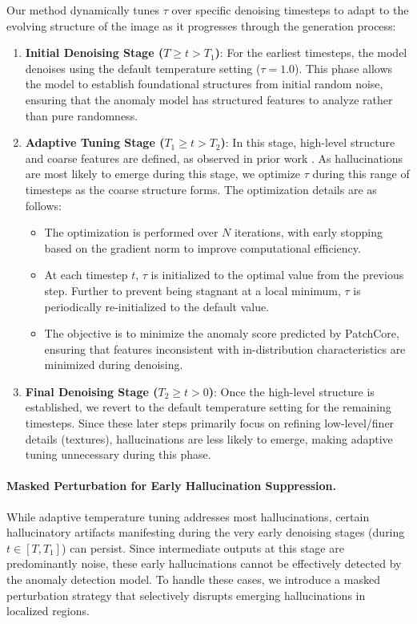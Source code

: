 Our method dynamically tunes $\tau$ over specific denoising timesteps to adapt to the evolving structure of the image as it progresses through the generation process:
\begin{enumerate}
    \item \textbf{Initial Denoising Stage ($T \ge t > T_1$)}:
    For the earliest timesteps, the model denoises using the default temperature setting (\ie $\tau=1.0$). 
    This phase allows the model to establish foundational structures from initial random noise, ensuring that the anomaly model has structured features to analyze rather than pure randomness.

    \item \textbf{Adaptive Tuning Stage  ($T_1 \ge t > T_2$)}: 
    In this stage, high-level structure and coarse features are defined, as observed in prior work \citep{choi2022perception, park2024explaining}.
    As hallucinations are most likely to emerge during this stage, we optimize $\tau$ during this range of timesteps as the coarse structure forms.
    The optimization details are as follows: 
    \begin{itemize}
        \item The optimization is performed over $N$ iterations, with early stopping based on the gradient norm to improve computational efficiency.
        \item At each timestep $t$, $\tau$ is initialized to the optimal value from the previous step. Further to prevent being stagnant at a local minimum, $\tau$ is periodically re-initialized to the default value.
        \item The objective is to minimize the anomaly score predicted by PatchCore, ensuring that features inconsistent with in-distribution characteristics are minimized during denoising.   
    \end{itemize}

    \item \textbf{Final Denoising Stage ($T_2 \ge t > 0$)}: 
    Once the high-level structure is established, we revert to the default temperature setting for the remaining timesteps.
    Since these later steps primarily focus on refining low-level/finer details (\eg textures), hallucinations are less likely to emerge, making adaptive tuning unnecessary during this phase.
\end{enumerate}

\vspace{-10pt}
\paragraph{Masked Perturbation for Early Hallucination Suppression.}
While adaptive temperature tuning addresses most hallucinations, certain hallucinatory artifacts manifesting during the very early denoising stages (\ie during $t \in [T,T_1]$) can persist. 
Since intermediate outputs at this stage are predominantly noise, these early hallucinations cannot be effectively detected by the anomaly detection model. 
To handle these cases, we introduce a masked perturbation strategy that selectively disrupts emerging hallucinations in localized regions. 

